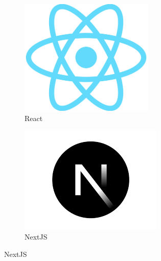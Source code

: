 \begin{figure}[ht]
    \centering
    \begin{subfigure}{0.4\textwidth}
        \centering
        \includegraphics[width=0.7\textwidth]{Images/8.Technology_Stack/react_logo.png}
        \caption{React}
    \end{subfigure}
    \begin{subfigure}{0.4\textwidth}
        \centering
        \includegraphics[width=\textwidth]{Images/8.Technology_Stack/nextjs_logo.png}
        \caption{NextJS}
    \end{subfigure}
\end{figure}

